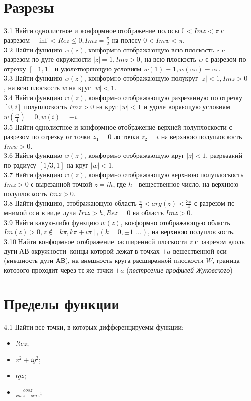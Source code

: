 \documentclass{article}
\begin{document}
\section{Разрезы} 
3.1 Найти однолистное и конформное отображение полосы $0 < Im z < \pi$ с разрезом $-\inf < Re z \leq 0, {Im} z =\frac{\pi}{2}$ на полосу $0 < {Im} w < \pi$.\\
3.2 Найти функцию $w(z)$, конформно отображающую всю плоскость $z$ c разрезом по дуге окружности $\vert z \vert = 1, Im {z}>0$, на всю плоскость $w$ с разрезом по отрезку $[-1, 1]$ и удолетворяющую условиям $w(1)=1, w(\infty)=\infty$.\\
3.3 Найти функцию $w(z)$, конформно отображающую полукруг $\vert z \vert < 1, Im {z}>0$, на всю плоскость $w$ на круг $\vert w \vert < 1$. \\
3.4 Найти функцию $w(z)$, конформно отображающую разрезанную по отрезку $[0, i]$ полуплоскость $Im {z}>0$  на круг $\vert w \vert < 1$ и удолетворяющую условиям $w(\frac{5i}{4})=0, w(i)=-i$.\\
3.5 Найти однолистное и конформное отображение верхней полуплоскости с разрезом по отрезку от точки $z_1 = 0$ до точки $z_2 = i$ на верхнюю полуплоскость $Im w > 0$.\\
3.6 Найти функцию $w(z)$, конформно отображающую круг $\vert z \vert < 1$, разрезаннй по радиусу $[1/3, 1]$ на круг $\vert w \vert < 1$.\\
3.7 Найти функцию $w(z)$, конформно отображающую верхнюю полуплоскость $Im z > 0$ с вырезанной точкой $z=ih$, где $h$ - вещественное число, на верхнюю полуплоскость $Im z > 0$.\\
3.8 Найти функцию, отображающую область $\frac{\pi}{4} < arg(z) < \frac{3\pi}{4}$ с разрезом по мнимой оси в виде луча $Im z>h, Re z = 0$ на область $Im z>0$.\\ 
3.9 Найти какую-либо функцию $w(z)$, конформно отображающую область ${Im(z)>0, z\not\in[k\pi, k\pi+i\pi], (k=0, \pm 1, ...)}$, на верхнюю полуплоскость.\\
3.10 Найти конформное отображение расширенной плоскости $z$ с разрезом вдоль дуги АВ окружности, концы которой лежат в точках $\pm a$ вещественной оси (внешность дуги АВ), на внешность круга расширенной плоскости $W$, граница которого проходит через те же точки $\pm a$ (\emph{построение профилей Жуковского})\\

\section{Пределы функции}
4.1 Найти все точки, в которых дифференцируемы функции:
\begin{itemize}
\item $Re z$;
\item $x^2+iy^2$;
\item $tg z$;
\item $\frac{cos z}{cos z - sin z}$;
\end{itemize}
\end{document}
